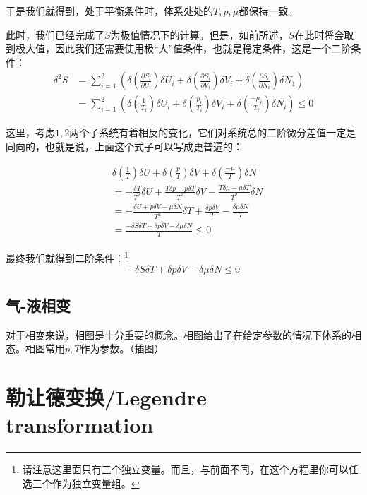 \documentclass[a4paper, 10pt, openany]{book}%
\begin{document}
于是我们就得到，处于平衡条件时，体系处处的$T,p,\mu$都保持一致。

此时，我们已经完成了$S$为极值情况下的计算。但是，如前所述，$S$在此时将会取到极大值，因此我们还需要使用极“大”值条件，也就是稳定条件，这是一个二阶条件：
\begin{align}
\delta^2 S&=\sum_{i=1}^2\left(\delta\left(\frac{\partial S_i}{\partial U_i}\right)\delta U_i+\delta\left(\frac{\partial S_i}{\partial V_i}\right)\delta V_i+\delta\left(\frac{\partial S_i}{\partial N_i}\right)\delta N_1\right)\\
&=\sum_{i=1}^2\left(\delta\left(\frac{1}{T_i}\right)\delta U_i+\delta\left(\frac{p_i}{T_i}\right)\delta V_i+\delta\left(\frac{-\mu_i}{T_i}\right)\delta N_i\right)\leq0
\end{align}

这里，考虑$1,2$两个子系统有着相反的变化，它们对系统总的二阶微分差值一定是同向的，也就是说，上面这个式子可以写成更普遍的：

\begin{align}
 & \delta\left(\frac{1}{T}\right)\delta U+\delta\left(\frac{p}{T}\right)\delta V+\delta\left(\frac{-\mu}{T}\right)\delta N\\
  &=-\frac{\delta T}{T^2}\delta U+\frac{T\delta p-p\delta T}{T^2}\delta V-\frac{T\delta\mu-\mu\delta T}{T^2}\delta N\\
  &=-\frac{\delta U+p\delta V-\mu\delta N}{T^2}\delta T+\frac{\delta p\delta V}{T}-\frac{\delta\mu\delta N}{T}\\
  &=\frac{-\delta S\delta T+\delta p\delta V-\delta\mu\delta N}{T}\leq0
\end{align}

最终我们就得到二阶条件：\footnote{请注意这里面只有三个独立变量。而且，与前面不同，在这个方程里你可以任选三个作为独立变量组。}
\begin{equation}
  -\delta S\delta T+\delta p\delta V-\delta\mu\delta N\leq0
\end{equation}

\section{气-液相变}
对于相变来说，相图是十分重要的概念。相图给出了在给定参数的情况下体系的相态。相图常用$p,T$作为参数。（插图）











\newpage
\appendix
\chapter{勒让德变换/Legendre transformation}
\end{document}
